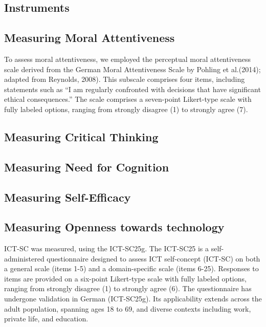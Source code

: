 \documentclass[
  12pt,
  a4paper,
  twoside]{article}
\begin{document}
\hypertarget{instruments}{%
\subsection{Instruments}\label{instruments}}

\hypertarget{measuring-moral-attentiveness}{%
\subsection{Measuring Moral Attentiveness}\label{measuring-moral-attentiveness}}

To assess moral attentiveness, we employed the perceptual moral attentiveness scale derived from the German Moral Attentiveness Scale by Pohling et al.(2014); adapted from Reynolds, 2008). This subscale comprises four items, including statements such as ``I am regularly confronted with decisions that have significant ethical consequences.'' The scale comprises a seven-point Likert-type scale with fully labeled options, ranging from strongly disagree (1) to strongly agree (7).

\hypertarget{measuring-critical-thinking}{%
\subsection{Measuring Critical Thinking}\label{measuring-critical-thinking}}

\hypertarget{measuring-need-for-cognition}{%
\subsection{Measuring Need for Cognition}\label{measuring-need-for-cognition}}

\hypertarget{measuring-self-efficacy}{%
\subsection{Measuring Self-Efficacy}\label{measuring-self-efficacy}}

\hypertarget{measuring-openness-towards-technology}{%
\subsection{Measuring Openness towards technology}\label{measuring-openness-towards-technology}}

ICT-SC was measured, using the ICT-SC25g. The ICT-SC25 is a self-administered questionnaire designed to assess ICT self-concept (ICT-SC) on both a general scale (items 1-5) and a domain-specific scale (items 6-25). Responses to items are provided on a six-point Likert-type scale with fully labeled options, ranging from strongly disagree (1) to strongly agree (6). The questionnaire has undergone validation in German (ICT-SC25g). Its applicability extends across the adult population, spanning ages 18 to 69, and diverse contexts including work, private life, and education.
\end{document}
